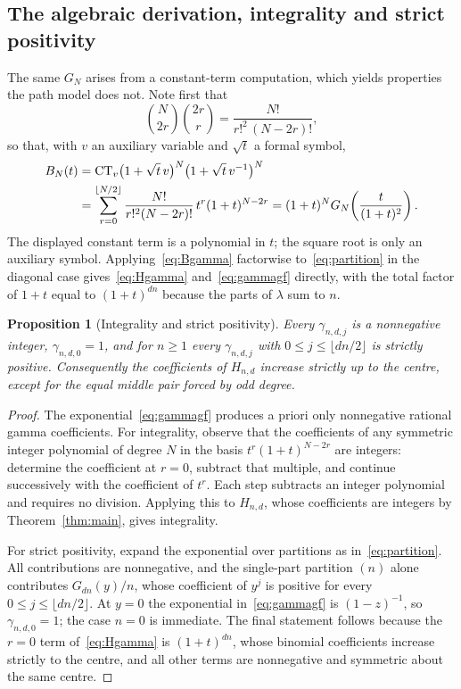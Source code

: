 \documentclass[11pt]{article}
\numberwithin{equation}{section}
\newtheorem{proposition}[theorem]{Proposition}
\theoremstyle{definition}
\newcommand{\CTv}{\operatorname{CT}_v}
\begin{document}
\subsection{The algebraic derivation, integrality and strict positivity}
\label{sec:gammaalg}
The same $G_N$ arises from a constant-term computation, which yields
properties the path model does not. Note first that
\begin{equation}
 \binom{N}{2r}\binom{2r}{r}=\frac{N!}{r!^2\,(N-2r)!},
\end{equation}
so that, with $v$ an auxiliary variable and $\sqrt t$ a formal symbol,
\begin{align}
 B_N(t)
 &=\CTv\bigl(1+\sqrt t\,v\bigr)^N\bigl(1+\sqrt t\,v^{-1}\bigr)^N \notag\\
 &=\sum_{r=0}^{\lfloor N/2\rfloor}\frac{N!}{r!^2(N-2r)!}\,
    t^r(1+t)^{N-2r}
 =(1+t)^NG_N\!\left(\frac{t}{(1+t)^2}\right).
 \label{eq:Bgamma}
\end{align}
The displayed constant term is a polynomial in $t$; the square root is only
an auxiliary symbol. Applying~\eqref{eq:Bgamma} factorwise
to~\eqref{eq:partition} in the diagonal case gives~\eqref{eq:Hgamma}
and~\eqref{eq:gammagf} directly, with the total factor of $1+t$ equal to
$(1+t)^{dn}$ because the parts of $\lambda$ sum to $n$.

\begin{proposition}[Integrality and strict positivity]
\label{prop:gammapos}
Every $\gamma_{n,d,j}$ is a nonnegative integer, $\gamma_{n,d,0}=1$, and for
$n\geq1$ every $\gamma_{n,d,j}$ with $0\leq j\leq\lfloor dn/2\rfloor$ is
strictly positive. Consequently the coefficients of $H_{n,d}$ increase
strictly up to the centre, except for the equal middle pair forced by odd
degree.
\end{proposition}
\begin{proof}
The exponential~\eqref{eq:gammagf} produces a priori only nonnegative rational
gamma coefficients. For integrality, observe that the coefficients of any
symmetric integer polynomial of degree $N$ in the basis $t^r(1+t)^{N-2r}$ are
integers: determine the coefficient at $r=0$, subtract that multiple, and
continue successively with the coefficient of $t^r$. Each step subtracts an
integer polynomial and requires no division. Applying this to $H_{n,d}$, whose
coefficients are integers by Theorem~\ref{thm:main}, gives integrality.

For strict positivity, expand the exponential over partitions as
in~\eqref{eq:partition}. All contributions are nonnegative, and the single-part
partition $(n)$ alone contributes $G_{dn}(y)/n$, whose coefficient of $y^j$ is
positive for every $0\leq j\leq\lfloor dn/2\rfloor$. At $y=0$ the exponential
in~\eqref{eq:gammagf} is $(1-z)^{-1}$, so $\gamma_{n,d,0}=1$; the case $n=0$ is
immediate. The final statement follows because the $r=0$ term
of~\eqref{eq:Hgamma} is $(1+t)^{dn}$, whose binomial coefficients increase
strictly to the centre, and all other terms are nonnegative and symmetric
about the same centre.
\end{proof}
\end{document}
